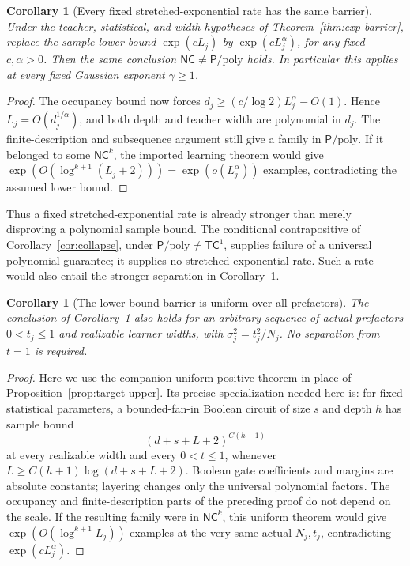 \documentclass[11pt]{article}
\newtheorem{corollary}[theorem]{Corollary}
\theoremstyle{remark}
\newcommand{\TC}{\mathsf{TC}}
\newcommand{\NC}{\mathsf{NC}}
\newcommand{\Ppoly}{\mathsf{P}/\mathrm{poly}}
\begin{document}
\begin{corollary}[Every fixed stretched-exponential rate has the same barrier]
\label{cor:stretched-exponential-barrier}
Under the teacher, statistical, and width hypotheses of
Theorem~\ref{thm:exp-barrier}, replace the sample lower bound
$\exp(cL_j)$ by $\exp(cL_j^\alpha)$, for any fixed $c,\alpha>0$.
Then the same conclusion $\NC\ne\Ppoly$ holds. In particular this
applies at every fixed Gaussian exponent $\gamma\ge1$.
\end{corollary}
\begin{proof}
The occupancy bound now forces
$d_j\ge(c/\log2)L_j^\alpha-O(1)$. Hence
$L_j=O(d_j^{1/\alpha})$, and both depth and teacher width are
polynomial in $d_j$. The finite-description and subsequence argument
still give a family in $\Ppoly$. If it belonged to some $\NC^k$,
the imported learning theorem would give
$\exp(O(\log^{k+1}(L_j+2)))=\exp(o(L_j^\alpha))$ examples,
contradicting the assumed lower bound.
\end{proof}

Thus a fixed stretched-exponential rate is already stronger than
merely disproving a polynomial sample bound. The conditional
contrapositive of Corollary~\ref{cor:collapse}, under
$\Ppoly\ne\TC^1$, supplies failure of a universal polynomial
guarantee; it supplies no stretched-exponential rate. Such a rate
would also entail the stronger separation in
Corollary~\ref{cor:stretched-exponential-barrier}.

\begin{corollary}[The lower-bound barrier is uniform over all prefactors]
\label{cor:all-prefactor-negative}
The conclusion of Corollary~\ref{cor:stretched-exponential-barrier}
also holds for an arbitrary sequence of actual prefactors
$0<t_j\le1$ and realizable learner widths, with
$\sigma_j^2=t_j^2/N_j$. No separation from $t=1$ is required.
\end{corollary}
\begin{proof}
Here we use the companion uniform positive theorem
\cite[Theorem \texttt{thm:threshold}, long-padding case]{uniformtargets}
in place of Proposition~\ref{prop:target-upper}. Its precise
specialization needed here is: for fixed statistical parameters,
a bounded-fan-in Boolean circuit of size $s$ and depth $h$ has
sample bound
\[
 (d+s+L+2)^{C(h+1)}
\]
at every realizable width and every $0<t\le1$, whenever
$L\ge C(h+1)\log(d+s+L+2)$. Boolean gate coefficients and
margins are absolute constants; layering changes only the
universal polynomial factors.
The occupancy and finite-description parts of the preceding
proof do not depend on the scale. If the resulting family were
in $\NC^k$, this uniform theorem would give
$\exp(O(\log^{k+1}L_j))$ examples at the very same actual
$N_j,t_j$, contradicting $\exp(cL_j^\alpha)$.
\end{proof}
\end{document}
